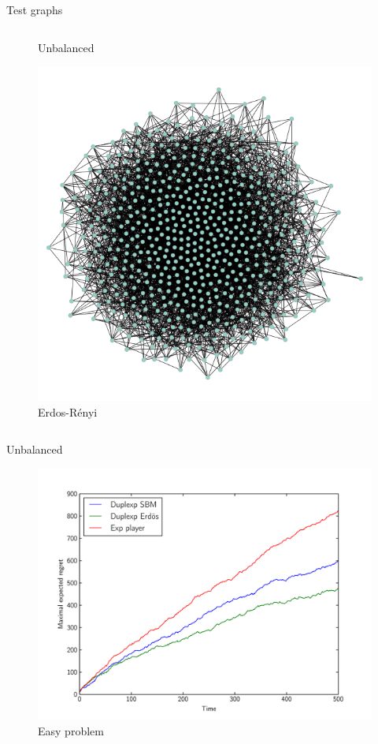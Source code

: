 \documentclass[11pt]{beamer}
\begin{document}
\begin{frame}{Test graphs}
\begin{columns}
\begin{column}{.5\textwidth}
\begin{figure}[ht]
			\caption{Unbalanced}
		\end{figure}
		\vspace{-2em}
		\begin{figure}[ht]
			\centering
			\includegraphics[width=.5\textwidth]{blockmodel3}
			\caption{Erdos-Rényi}
		\end{figure}
	\end{column}
\end{columns}
\end{frame}

\begin{frame}{Unbalanced}
\begin{figure}[ht]
	\centering
	\includegraphics[width=.8\textwidth]{easy}
	\caption{Easy problem}
\end{figure}
\end{frame}
\end{document}
